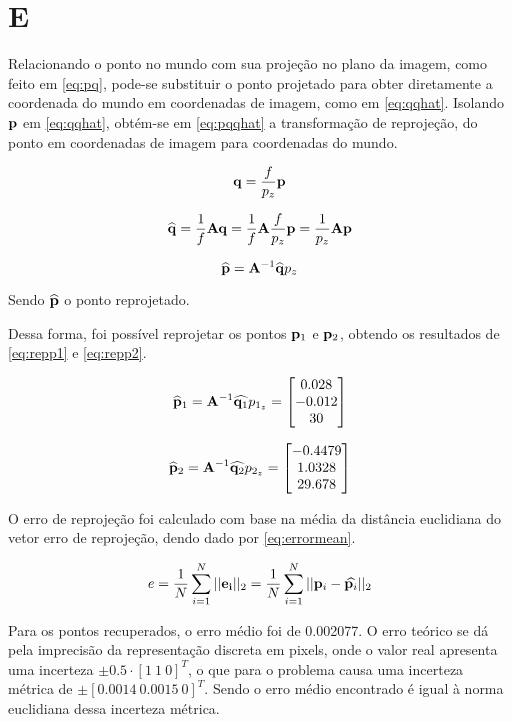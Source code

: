 \section{E}

Relacionando o ponto no mundo com sua projeção no plano da imagem, como feito em \eqref{eq:pq}, pode-se substituir o ponto projetado para obter diretamente a coordenada do mundo em coordenadas de imagem, como em \eqref{eq:qqhat}. Isolando $\mathbf{p}$ em \eqref{eq:qqhat}, obtém-se em \eqref{eq:pqqhat} a transformação de reprojeção, do ponto em coordenadas de imagem para coordenadas do mundo.

\begin{equation}\label{eq:pq}
	\mathbf{q} = \frac{f}{p_z}\mathbf{p} 
\end{equation}

\begin{equation}\label{eq:qqhat}
	\widehat{\mathbf{q}} = \frac{1}{f}\mathbf{A} \mathbf{q}  = \frac{1}{f}\mathbf{A}\frac{f}{p_z}\mathbf{p}  = \frac{1}{p_z}\mathbf{A}\mathbf{p} 
\end{equation}

\begin{equation}\label{eq:pqqhat}
	\widehat{\mathbf{p}} = \mathbf{A}^{-1}\widehat{\mathbf{q}}p_z
\end{equation}

Sendo $\widehat{\mathbf{p}}$ o ponto reprojetado.

Dessa forma, foi possível reprojetar os pontos $\mathbf{p}_1$ e $\mathbf{p}_2$, obtendo os resultados de \eqref{eq:repp1} e \eqref{eq:repp2}.

\begin{equation}\label{eq:repp1}
	\widehat{\mathbf{p}}_1 = \mathbf{A}^{-1}\widehat{\mathbf{q}_1}p_{1_z} = \begin{bmatrix}
		0.028\\
		  -0.012\\
		   30
	\end{bmatrix}
\end{equation}

\begin{equation}\label{eq:repp2}
	\widehat{\mathbf{p}}_2 = \mathbf{A}^{-1}\widehat{\mathbf{q}_2}p_{2_z} = \begin{bmatrix}
	-0.4479 \\
	 1.0328 \\
	 29.678
\end{bmatrix}
\end{equation}

O erro de reprojeção foi calculado com base na média da distância euclidiana do vetor erro de reprojeção, dendo dado por \eqref{eq:errormean}.

\begin{equation}\label{eq:errormean}
	e = \frac{1}{N}\sum_{i=1}^{N}||\mathbf{e_i}||_2 = \frac{1}{N}\sum_{i=1}^{N}||\mathbf{p}_i - \widehat{\mathbf{p}_i}||_2
\end{equation}

Para os pontos recuperados, o erro médio foi de 0.002077. 
O erro teórico se dá pela imprecisão da representação discreta em pixels, onde o valor real apresenta uma incerteza $\pm 0.5 \cdot \left[1 \ 1 \ 0\right]^T$, o que para o problema causa uma incerteza métrica de $\pm \left[0.0014 \ 0.0015 \ 0\right]^T$. Sendo o erro médio encontrado é igual à norma euclidiana dessa incerteza métrica.